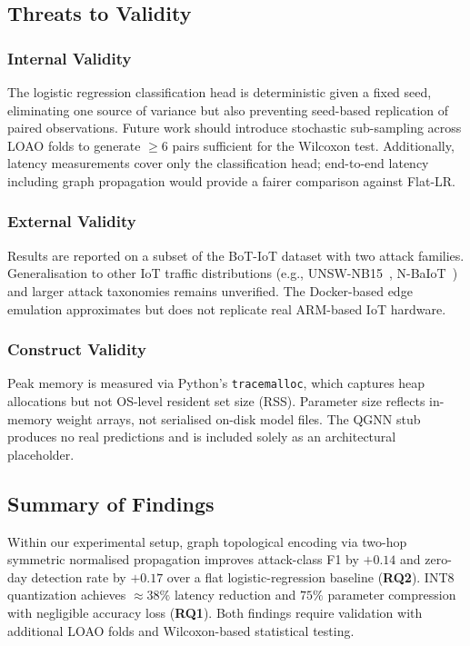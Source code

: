 \documentclass[conference]{IEEEtran}
\begin{document}
\subsection{Threats to Validity}

\subsubsection{Internal Validity}
The logistic regression classification head is deterministic given a fixed
seed, eliminating one source of variance but also preventing seed-based
replication of paired observations.  Future work should introduce stochastic
sub-sampling across LOAO folds to generate ${\ge}6$ pairs sufficient for the
Wilcoxon test.  Additionally, latency measurements cover only the
classification head; end-to-end latency including graph propagation would
provide a fairer comparison against Flat-LR.

\subsubsection{External Validity}
Results are reported on a subset of the BoT-IoT dataset with two attack
families.  Generalisation to other IoT traffic distributions (e.g.,
UNSW-NB15~\cite{moustafa2015unsw}, N-BaIoT~\cite{meidan2018nbaiot}) and
larger attack taxonomies remains unverified.  The Docker-based edge emulation
approximates but does not replicate real ARM-based IoT hardware.

\subsubsection{Construct Validity}
Peak memory is measured via Python's \texttt{tracemalloc}, which captures heap
allocations but not OS-level resident set size (RSS).  Parameter size reflects
in-memory weight arrays, not serialised on-disk model files.  The QGNN stub
produces no real predictions and is included solely as an architectural
placeholder.

\subsection{Summary of Findings}
Within our experimental setup, graph topological encoding via two-hop symmetric
normalised propagation improves attack-class F1 by $+0.14$ and zero-day
detection rate by $+0.17$ over a flat logistic-regression baseline (\textbf{RQ2}).
INT8 quantization achieves ${\approx}38\%$ latency reduction and $75\%$
parameter compression with negligible accuracy loss (\textbf{RQ1}).  Both
findings require validation with additional LOAO folds and
Wilcoxon-based statistical testing.
\end{document}

